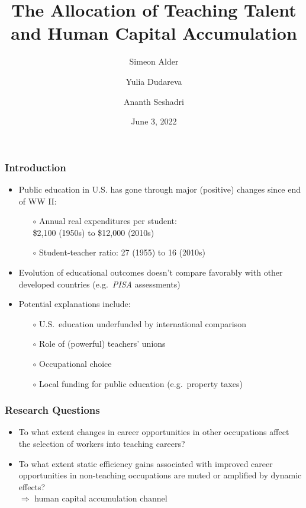 \documentclass[11pt]{beamer}
\title{The Allocation of Teaching Talent and Human Capital Accumulation}
\author[shortname]{Simeon Alder\inst{1} \and Yulia Dudareva\inst{1} \and Ananth Seshadri\inst{1}}
\institute[shortinst]{\inst{1} University of Wisconsin--Madison}
\date{June 3, 2022}
\begin{document}
	
	\begin{frame}
		\titlepage
	\end{frame}
	
	\begin{frame}
		\frametitle{Introduction}
		\vfill
		\begin{itemize}
			\item Public education in U.S. has gone through major (positive) changes since end of WW II:
			\begin{itemize}
				\item[$\circ$] Annual real expenditures per student: \\
				\$2,100 (1950s) to \$12,000 (2010s)
				\item[$\circ$] Student-teacher ratio: 27 (1955) to 16 (2010s)
			\end{itemize}
			\vfill
			\item Evolution of educational outcomes doesn't compare favorably with other developed countries (e.g.~{\it PISA} assessments)
			\vfill
			\item Potential explanations include:
			\begin{itemize}
				\item[$\circ$] U.S.~education underfunded by international comparison
				\item[$\circ$] Role of (powerful) teachers' unions \pause
				\item[$\circ$] \alert{Occupational choice} \pause
				\item[$\circ$] Local funding for public education (e.g.~property taxes)
			\end{itemize}
		\end{itemize}
		\vfill
	\end{frame}
	
	\begin{frame}
		\frametitle{Research Questions}
		\vfill
		\begin{itemize}
			\item To what extent changes in career opportunities in other occupations affect the selection of workers into teaching careers?
			\vfill
			\item To what extent static efficiency gains associated with improved career opportunities in non-teaching occupations are muted or amplified by dynamic effects?\\
			$\Rightarrow$ human capital accumulation channel
		\end{itemize}
		\vfill
	\end{frame}
	
\end{document}

